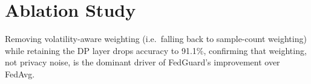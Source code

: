 \section{Ablation Study}
Removing volatility-aware weighting (i.e.\ falling back to sample-count weighting) while
retaining the DP layer drops accuracy to 91.1\%, confirming that weighting, not privacy
noise, is the dominant driver of FedGuard's improvement over FedAvg.
